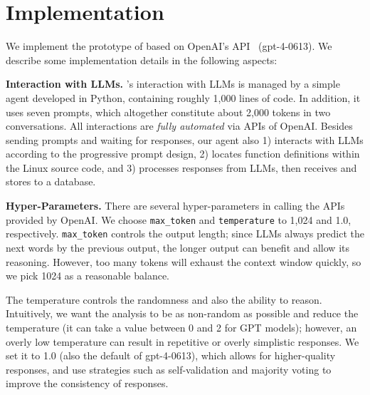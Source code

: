 \section{Implementation}

We implement the prototype of \work based on OpenAI's API~\cite{openai_2022_introducing_2022}
(\ie gpt-4-0613).
We describe some implementation details in the following aspects:


\vspace{3pt}
\noindent
\textbf{Interaction with LLMs.} \work's interaction with LLMs is managed by a simple agent developed in Python, containing roughly 1,000 lines of code. In addition, it uses seven prompts, which altogether constitute about 2,000 tokens in two conversations.
All interactions are \textit{fully automated} via APIs of OpenAI. 
Besides sending prompts and waiting for responses, our agent also 1) interacts with LLMs according to the progressive prompt design, 2) locates function definitions within the Linux source code, and 3) processes responses from LLMs, then receives and stores to a database.

\vspace{3pt}
\noindent
\textbf{Hyper-Parameters.} There are several hyper-parameters in calling the APIs provided by OpenAI. We choose \texttt{max\_token} and \texttt{temperature} to 1,024 and 1.0, respectively. \texttt{max\_token} controls the output length; since LLMs always predict the next words by the previous output, the longer output can benefit and allow its reasoning. However, too many tokens will exhaust the context window quickly, so we pick 1024 as a reasonable balance.

The temperature controls the randomness and also the ability to reason. 
Intuitively, we want the analysis to be as non-random as possible and reduce the temperature (it can take a value between 0 and 2 for GPT models);
however, an overly low temperature can result in repetitive or overly simplistic responses. We set it to 1.0 (also the default of gpt-4-0613), which allows for higher-quality responses, and use strategies such as self-validation and majority voting to improve the consistency of responses.

